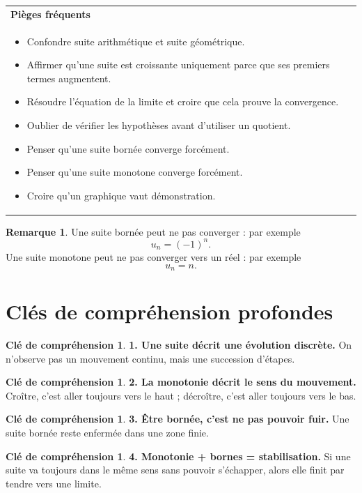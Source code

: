 \documentclass[11pt,a4paper]{article}
\theoremstyle{definition}
\newtheorem{remarque}[definition]{Remarque}
\newtheorem{interpretation}[definition]{Clé de compréhension}
\theoremstyle{plain}
\theoremstyle{remark}
\newenvironment{encadre}[1]
{\begin{center}
\begin{tabular}{|p{0.93\textwidth}|}
\hline
\textbf{#1} \\
}
{\\ \hline
\end{tabular}
\end{center}}
\begin{document}
\begin{encadre}{Pièges fréquents}
\begin{itemize}[leftmargin=0.8cm]
    \item Confondre suite arithmétique et suite géométrique.
    \item Affirmer qu'une suite est croissante uniquement parce que ses premiers termes augmentent.
    \item Résoudre l'équation de la limite et croire que cela prouve la convergence.
    \item Oublier de vérifier les hypothèses avant d'utiliser un quotient.
    \item Penser qu'une suite bornée converge forcément.
    \item Penser qu'une suite monotone converge forcément.
    \item Croire qu'un graphique vaut démonstration.
\end{itemize}
\end{encadre}

\begin{remarque}
Une suite bornée peut ne pas converger : par exemple
\[
u_n=(-1)^n.
\]
Une suite monotone peut ne pas converger vers un réel : par exemple
\[
u_n=n.
\]
\end{remarque}

\section{Clés de compréhension profondes}

\begin{interpretation}
\textbf{1. Une suite décrit une évolution discrète.}  
On n'observe pas un mouvement continu, mais une succession d'étapes.
\end{interpretation}

\begin{interpretation}
\textbf{2. La monotonie décrit le sens du mouvement.}  
Croître, c'est aller toujours vers le haut ; décroître, c'est aller toujours vers le bas.
\end{interpretation}

\begin{interpretation}
\textbf{3. Être bornée, c'est ne pas pouvoir fuir.}  
Une suite bornée reste enfermée dans une zone finie.
\end{interpretation}

\begin{interpretation}
\textbf{4. Monotonie + bornes = stabilisation.}  
Si une suite va toujours dans le même sens sans pouvoir s'échapper, alors elle finit par tendre vers une limite.
\end{interpretation}
\end{document}
